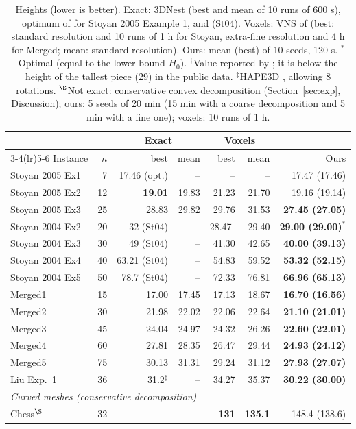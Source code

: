 \documentclass[preprint,12pt,authoryear]{elsarticle}
\begin{document}
\begin{table}[!tbp]
\centering\small
\caption{Heights (lower is better). Exact: 3DNest \citep{egeblad2009} (best and mean of 10 runs of 600 s),
optimum of \citet{tollenaere2026} for Stoyan 2005 Example 1, and \citet{stoyan2004} (St04). Voxels: VNS of
\citet{lamas2023} (best: standard resolution and 10 runs of 1 h for Stoyan, extra-fine resolution and 4 h for
Merged; mean: standard resolution). Ours: mean (best) of 10 seeds, 120 s. $^*$Optimal (equal to the lower bound
$H_0$). $^\dagger$Value reported by \citet{lamas2023}; it is below the height of the tallest piece (29) in the
public data. $^\ddagger$HAPE3D \citep{liu2015}, allowing 8 rotations. $^\S$Not exact: conservative convex decomposition
(Section~\ref{sec:exp}, Discussion); ours: 5 seeds of 20 min (15 min with a coarse decomposition and 5 min with a
fine one); voxels: 10 runs of 1 h.}
\label{tab:results}
\begin{tabular}{lrrrrrr}
\toprule
& & \multicolumn{2}{c}{Exact} & \multicolumn{2}{c}{Voxels} & \\
\cmidrule(lr){3-4}\cmidrule(lr){5-6}
Instance & $n$ & best & mean & best & mean & Ours\\
\midrule
Stoyan 2005 Ex1 & 7 & 17.46 (opt.) & -- & -- & -- & 17.47 (17.46)\\
Stoyan 2005 Ex2 & 12 & \textbf{19.01} & 19.83 & 21.23 & 21.70 & 19.16 (19.14)\\
Stoyan 2005 Ex3 & 25 & 28.83 & 29.82 & 29.76 & 31.53 & \textbf{27.45 (27.05)}\\
Stoyan 2004 Ex2 & 20 & 32 (St04) & -- & 28.47$^\dagger$ & 29.40 & \textbf{29.00 (29.00)}$^*$\\
Stoyan 2004 Ex3 & 30 & 49 (St04) & -- & 41.30 & 42.65 & \textbf{40.00 (39.13)}\\
Stoyan 2004 Ex4 & 40 & 63.21 (St04) & -- & 54.83 & 59.52 & \textbf{53.32 (52.15)}\\
Stoyan 2004 Ex5 & 50 & 78.7 (St04) & -- & 72.33 & 76.81 & \textbf{66.96 (65.13)}\\
Merged1 & 15 & 17.00 & 17.45 & 17.13 & 18.67 & \textbf{16.70 (16.56)}\\
Merged2 & 30 & 21.98 & 22.02 & 22.06 & 22.64 & \textbf{21.10 (21.01)}\\
Merged3 & 45 & 24.04 & 24.97 & 24.32 & 26.26 & \textbf{22.60 (22.01)}\\
Merged4 & 60 & 27.81 & 28.35 & 26.47 & 29.44 & \textbf{24.93 (24.12)}\\
Merged5 & 75 & 30.13 & 31.31 & 29.24 & 31.12 & \textbf{27.93 (27.07)}\\
Liu Exp.~1 & 36 & 31.2$^\ddagger$ & -- & 34.27 & 35.37 & \textbf{30.22 (30.00)}\\
\midrule
\multicolumn{7}{l}{\emph{Curved meshes (conservative decomposition)}}\\
Chess$^\S$ & 32 & -- & -- & \textbf{131} & \textbf{135.1} & 148.4 (138.6)\\
\bottomrule
\end{tabular}
\end{table}
\end{document}
